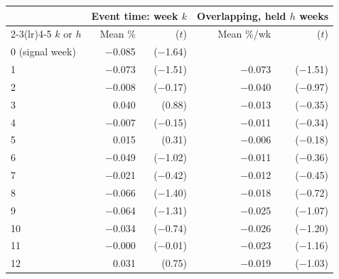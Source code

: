 \begin{tabular}{lrrrr}
\toprule
 & \multicolumn{2}{c}{Event time: week $k$} & \multicolumn{2}{c}{Overlapping, held $h$ weeks} \\
\cmidrule(lr){2-3}\cmidrule(lr){4-5}
$k$ or $h$ & Mean \% & ($t$) & Mean \%/wk & ($t$) \\
\midrule
0 (signal week) & $-$0.085 & ($-$1.64) & & \\
\midrule
1 & $-$0.073 & ($-$1.51) & $-$0.073 & ($-$1.51) \\
2 & $-$0.008 & ($-$0.17) & $-$0.040 & ($-$0.97) \\
3 & 0.040 & (0.88) & $-$0.013 & ($-$0.35) \\
4 & $-$0.007 & ($-$0.15) & $-$0.011 & ($-$0.34) \\
5 & 0.015 & (0.31) & $-$0.006 & ($-$0.18) \\
6 & $-$0.049 & ($-$1.02) & $-$0.011 & ($-$0.36) \\
7 & $-$0.021 & ($-$0.42) & $-$0.012 & ($-$0.45) \\
8 & $-$0.066 & ($-$1.40) & $-$0.018 & ($-$0.72) \\
9 & $-$0.064 & ($-$1.31) & $-$0.025 & ($-$1.07) \\
10 & $-$0.034 & ($-$0.74) & $-$0.026 & ($-$1.20) \\
11 & $-$0.000 & ($-$0.01) & $-$0.023 & ($-$1.16) \\
12 & 0.031 & (0.75) & $-$0.019 & ($-$1.03) \\
\bottomrule
\end{tabular}